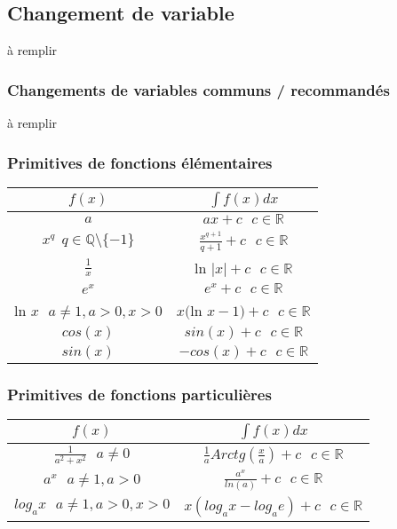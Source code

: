 \documentclass[12pt, a4paper]{book}
\begin{document}
\subsection{Changement de variable}
à remplir
\subsubsection{Changements de variables communs / recommandés}
à remplir
\newpage
\subsubsection{Primitives de fonctions élémentaires}
\begin{center}
    \begin{tabular}{|c|c|}
        \hline
       $f(x)$ & $\int f(x)dx$\\
        \hline
        $a$ & $ax+c \ \ \ c \in \mathbb{R}$\\
        $x^q \ \ q \in \mathbb{Q} \setminus \{-1\}$ & $\frac{x^{q+1}}{q+1}+c \ \ \ c \in \mathbb{R}$\\
        $\frac{1}{x}$ & ln $\lvert x \rvert + c \ \ \ c \in \mathbb{R}$\\
        $e^x$ & $e^x + c \ \ \ c \in \mathbb{R}$\\
        ln $x \ \ \ a \not = 1, a>0, x>0$& $x($ln $x-1)+c \ \ \ c \in \mathbb{R}$\\
        $cos(x)$ & $sin(x)+c \ \ \ c \in \mathbb{R}$\\
        $sin(x)$ & $-cos(x)+c \ \ \ c \in \mathbb{R}$\\
        \hline
    \end{tabular}
\end{center}
\subsubsection{Primitives de fonctions particulières}
\begin{center}
    \begin{tabular}{|c|c|}
        \hline
       $f(x)$ & $\int f(x)dx$\\
        \hline
        $\frac{1}{a^2+x^2} \ \ \ a \not = 0$& $\frac{1}{a}Arctg(\frac{x}{a})+c \ \ \ c \in \mathbb{R}$\\
        $a^x \ \ \ a \not = 1, a>0$& $\frac{a^x}{ln(a)}+c \ \ \ c \in \mathbb{R}$\\
        $log_ax \ \ \ a \not = 1, a>0, x>0$& $x(log_ax-log_ae)+c \ \ \ c \in \mathbb{R}$\\
    
        \hline
    \end{tabular}
\end{center}
\newpage
\end{document}

